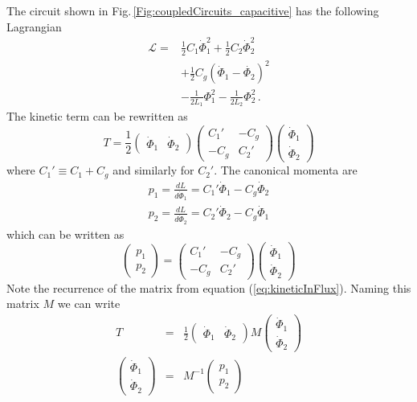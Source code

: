 The circuit shown in Fig.\,\ref{Fig:coupledCircuits_capacitive} has the following Lagrangian \begin{align}
\mathcal{L} = & \frac{1}{2}C_1\dot{\Phi}_1^2 + \frac{1}{2}C_2\dot{\Phi}_2^2 \nonumber \\
& + \frac{1}{2}C_g \left( \dot{\Phi}_1 - \dot{\Phi_2} \right)^2 \nonumber \\
& - \frac{1}{2L_1}\Phi_1^2 - \frac{1}{2L_2}\Phi_2^2 \, . \end{align}
The kinetic term can be rewritten as \begin{equation}
T = \frac{1}{2}
\left( \begin{array}{cc} \dot{\Phi}_1 & \dot{\Phi}_2 \end{array} \right)
\left( \begin{array}{cc} C_1' & -C_g \\ -C_g & C_2' \end{array} \right)
\left( \begin{array}{c} \dot{\Phi}_1 \\ \dot{\Phi}_2 \end{array} \right) \label{eq:kineticInFlux} \end{equation}
where $C_1' \equiv C_1+C_g$ and similarly for $C_2'$. The canonical momenta are \begin{eqnarray}
p_1 = \frac{dL}{d\dot{\Phi}_1} = C_1'\dot{\Phi}_1 - C_g\dot{\Phi}_2 \nonumber \\
p_2 = \frac{dL}{d\dot{\Phi}_2} = C_2'\dot{\Phi}_2 - C_g\dot{\Phi}_1 \end{eqnarray}
which can be written as \begin{equation}
\left( \begin{array}{c} p_1 \\ p_2 \end{array} \right) =
\left( \begin{array}{cc} C_1' & -C_g \\ -C_g & C_2' \end{array} \right)
\left( \begin{array}{c} \dot{\Phi}_1 \\ \dot{\Phi}_2 \end{array} \right) \end{equation}
Note the recurrence of the matrix from equation (\ref{eq:kineticInFlux}). Naming this matrix $M$ we can write \begin{eqnarray}
T &=& \frac{1}{2}
      \left( \begin{array}{cc} \dot{\Phi}_1&\dot{\Phi}_2 \end{array} \right)
      M
      \left( \begin{array}{c} \dot{\Phi}_1 \\ \dot{\Phi}_2 \end{array} \right) \label{eq:kineticWithM} \\
\left( \begin{array}{c} \dot{\Phi}_1 \\ \dot{\Phi}_2 \end{array} \right) &=& M^{-1} \left( \begin{array}{c} p_1 \\ p_2 \end{array} \right) \label{eq:fluxToMomenta} \end{eqnarray}
